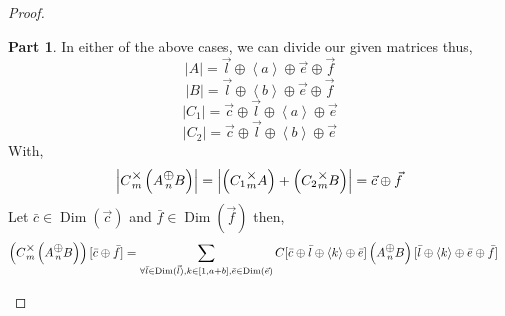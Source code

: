 \documentclass[12pt]{book}
\theoremstyle{plain}
\theoremstyle{definition}
\theoremstyle{ppart}
\newtheorem{ppart}{Part}
\theoremstyle{case}
\theoremstyle{solution}
\DeclareMathOperator{\Dim}{Dim}
\newcommand{\mmult}[1]{\text{\raisebox{1ex}{$\underset{#1}{\times}$}}}
\newcommand{\mconcat}[1]{\text{\raisebox{1ex}{$\underset{#1}{\oplus}$}}}
\newcommand{\shape}[1]{\left|#1\right|}
\begin{document}
\begin{landscape}
\begin{proof}
\begin{ppart}
In either of the above cases, we can divide our given matrices thus,
\[ \shape{A} = \vec{l} \oplus \left< a \right> \oplus \vec{e} \oplus \vec{f} \]
\[ \shape{B} = \vec{l} \oplus \left< b \right> \oplus \vec{e} \oplus \vec{f} \]
\[ \shape{C_1} = \vec{c} \oplus \vec{l} \oplus \left< a \right> \oplus \vec{e} \]
\[ \shape{C_2} = \vec{c} \oplus \vec{l} \oplus \left< b \right> \oplus \vec{e} \]
With,
\[ \shape{C \mmult{m} \left(A \mconcat{n} B\right)} = \shape{\left(C_1 \mmult{m} A\right) + \left(C_2 \mmult{m} B\right)} = \vec{c} \oplus \vec{f} \]
Let $\bar{c} \in \Dim(\vec{c})$ and $\bar{f} \in \Dim(\vec{f})$ then,
\begin{align*}
  \left(C \mmult{m} \left(A \mconcat{n} B\right)\right)[\bar{c} \oplus \bar{f}]
  &=
    \sum_{\forall \bar{l} \in \Dim(\vec{l}), k \in [1,a+b], \bar{e} \in \Dim(\vec{e})}
      C[\bar{c} \oplus \bar{l} \oplus \left<k\right> \oplus \bar{e}]
      \left(A \mconcat{n} B\right)[\bar{l} \oplus \left<k\right> \oplus \bar{e} \oplus \bar{f}]
\end{align*}
\end{ppart}

\end{proof}

\end{landscape}
\end{document}

